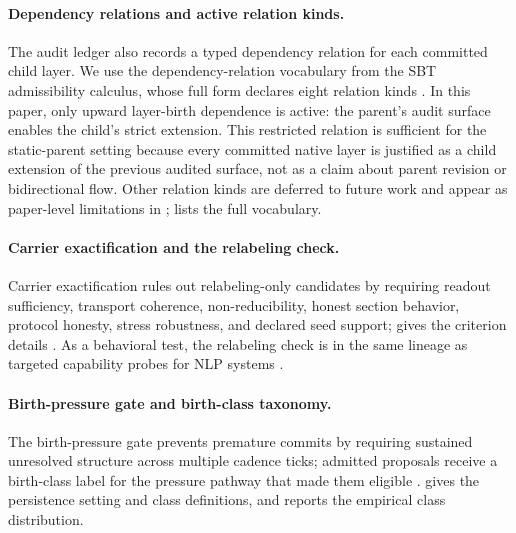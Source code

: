 \documentclass{article}
\theoremstyle{definition}
\begin{document}
\paragraph{Dependency relations and active relation kinds.}\label{subsec:dep-relations}
The audit ledger also records a typed dependency relation for each committed child layer. We use the dependency-relation vocabulary from the SBT admissibility calculus, whose full form declares eight relation kinds \cite{Tsiokos2026FoundationsIII}. In this paper, only upward layer-birth dependence is active: the parent's audit surface enables the child's strict extension. This restricted relation is sufficient for the static-parent setting because every committed native layer is justified as a child extension of the previous audited surface, not as a claim about parent revision or bidirectional flow. Other relation kinds are deferred to future work and appear as paper-level limitations in ;  lists the full vocabulary.

\paragraph{Carrier exactification and the relabeling check.}\label{subsec:exactification}
Carrier exactification rules out relabeling-only candidates by requiring readout sufficiency, transport coherence, non-reducibility, honest section behavior, protocol honesty, stress robustness, and declared seed support;  gives the criterion details \cite{Tsiokos2026AcceptedNewLayer}. As a behavioral test, the relabeling check is in the same lineage as targeted capability probes for NLP systems \cite{Ribeiro2020CheckList}.

\paragraph{Birth-pressure gate and birth-class taxonomy.}\label{subsec:birth-pressure}
The birth-pressure gate prevents premature commits by requiring sustained unresolved structure across multiple cadence ticks; admitted proposals receive a birth-class label for the pressure pathway that made them eligible \cite{Tsiokos2026FoundationsIII}.  gives the persistence setting and class definitions, and  reports the empirical class distribution.
\end{document}
